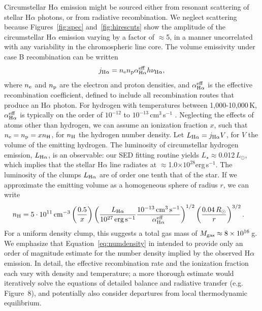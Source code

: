 \documentclass{nature3}
\begin{document}
\begin{methods}
Circumstellar H$\alpha$ emission might be sourced either from resonant
scattering of stellar H$\alpha$ photons, or from radiative
recombination.  We neglect scattering because Figures~\ref{fig:spec}
and~\ref{fig:hirescuts} show the amplitude of the circumstellar
H$\alpha$ emission varying by a factor of $\approx$5, in a manner
uncorrelated with any variability in the chromospheric line core.  The
volume emissivity under case B recombination can be written
\begin{equation} j_{\rm H\alpha} = n_{\rm e} n_{\rm p} \alpha^{\rm
eff}_{\rm H\alpha} h \nu_{\rm H\alpha}, \end{equation} where $n_{\rm
e}$ and $n_{\rm p}$ are the electron and proton densities, and
$\alpha^{\rm eff}_{\rm H\alpha}$ is the effective recombination
coefficient, defined to include all recombination routes that produce
an H$\alpha$ photon.  For hydrogen with temperatures between
1,000-10,000\,K, $\alpha^{\rm eff}_{\rm H\alpha}$ is typically on the
order of $10^{-12}$ to $10^{-13}$\,cm$^3$\,s$^{-1}$
\cite{Hummer1987,Draine2011}.  Neglecting the effects of atoms other
than hydrogen, we can assume an ionization fraction $x$, such that
$n_{\rm e} = n_{\rm p} = x n_{\rm H}$, for $n_{\rm H}$ the hydrogen
number density.  Let $L_{\rm H\alpha} = j_{\rm H\alpha} V$, for $V$
the volume of the emitting hydrogen.  The luminosity of circumstellar
hydrogen emission, $L_{\rm H\alpha}$, is an observable: our SED
fitting routine yields $L_\star$$\approx$0.012\,$L_\odot$, which
implies that the stellar H$\alpha$ line radiates at
$\approx$1.0$\times$$10^{28}$erg\,s$^{-1}$.  The luminosity of the
clumps $L_{\rm H\alpha}$ are of order one tenth that of the star.  If
we approximate the emitting volume as a homogeneous sphere of radius
$r$, we can write
\begin{align}
  n_{\rm H} &= 
  5 \cdot 10^{11}\,{\rm cm}^{-3}
  \left(
    \frac{0.5}{x}
  \right)
  \left( 
    \frac{ L_{\rm H\alpha} }{ 10^{27}\,{\rm erg\,s^{-1}} }
    \frac{ 10^{-13}\,{\rm cm^{3}\,s^{-1}} }{ \alpha^{\rm eff}_{\rm H\alpha} }
  \right)^{1/2}
  \left(
    \frac{ 0.04\,R_\odot }{ r }
  \right)^{3/2}.
  \label{eq:numdensity}
\end{align}
For a uniform density clump, this suggests a total gas mass of $M_{\rm
gas}\approx 8\times10^{16}$\,g.
We emphasize that Equation~\ref{eq:numdensity} in intended to provide
only an order of magnitude estimate for the number density implied by
the observed H$\alpha$ emission.  In detail, the effective
recombination rate and the ionization fraction each vary with density
and temperature; a more thorough estimate would iteratively solve the
equations of detailed balance and radiative transfer
(e.g.~\cite{CollierCameron1989} Figure~8), and potentially also
consider departures from local thermodynamic equilibrium.


\end{methods}
\end{document}
